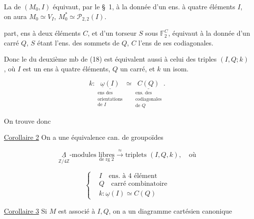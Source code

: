 
La  de $(M_0,I)$ équivaut, par le \S~1, à la donnée d'un ens. à quatre éléments $I$, on aura $M_0\simeq V_I$, $M_0^*\simeq\mathcal P_{2,2}(I)$.

  part,   ens à deux éléments $C$, et d'un torseur $S$ sous $\mathbb F_2^C$, équivaut à la donnée d'un carré $Q$, $S$ étant l'ens. des sommets de $Q$, $C$ l'ens de ses codiagonales.

Donc le   du deuxième mb de (18) est équivalent aussi à celui des triples $(I,Q;k)$, où $I$ est un ens à quatre éléments, $Q$ un carré, et $k$ un isom.

\[
 k:\underset{\substack{\text{ens des}\\\text{orientations}\\\text{de }I}}{\underline{\underline\omega(I)}}\simeq
 \underset{\substack{\text{ens. des}\\\text{codiagonales}\\\text{de }Q}}{\underline{C(Q)}}. \tag*{(20)}
\]

On trouve donc

\uline{Corollaire 2} On a une équivalence can. de groupoïdes

\[
\underset{\mathbb Z/4\mathbb Z}{\underline\Lambda}\text{-modules }\underset{\text{de rg }2}{\text{libres}}
\xrightarrow{\approx}\text{triplets }(I,Q,k),\quad\text{où} \tag*{(21)}
\]

\[
\left\{\begin{aligned}
&I\quad\text{ens. à }4\text{ élément}\\
&Q\quad\text{carré combinatoire}\\
&k:\underline\omega(I)\simeq C(Q)
\end{aligned}\right.
\]

\uline{Corollaire 3} Si $M$ est associé à $I,Q$, on a un diagramme cartésien canonique

